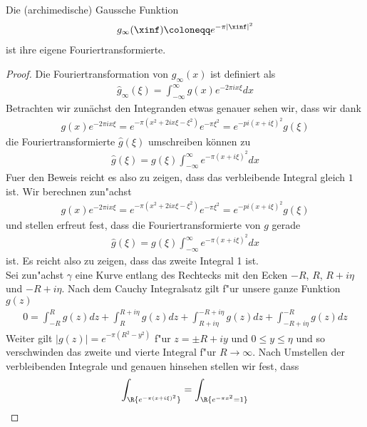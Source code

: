 %
	\begin{satz}
		Die (archimedische) Gaussche Funktion
		\begin{align}
			g_\infty(\xinf) \coloneqq  e^{-\pi |\xinf|^2}
		\end{align}
		ist ihre eigene Fouriertransformierte.
	\end{satz}

	\begin{proof}
		Die Fouriertransformation von $g_\infty(x)$ ist definiert als
		\begin{align*}
			\hat{g}_\infty (\xi) = \int_{-\infty}^{\infty}{g(x)e^{-2\pi i x \xi}dx}
		\end{align*}
		Betrachten wir zunächst den Integranden etwas genauer sehen wir, dass wir dank
		\begin{align*}
			g(x)e^{-2\pi i x \xi} = e^{-\pi(x^2 +2 i x \xi - \xi ^2)}e^{-\pi \xi^2} = e^{-pi (x + i \xi)^2} g(\xi)
		\end{align*}
		die Fouriertransformierte $\hat{g} (\xi)$ umschreiben können zu
		\begin{align*}
			\hat{g}(\xi) = g(\xi) \int_{-\infty}^{\infty} {e^{-\pi(x+i\xi)^2}dx}
		\end{align*}
		Fuer den Beweis reicht es also zu zeigen, dass das verbleibende Integral gleich $1$ ist.
		Wir berechnen zun"achst
		\begin{align*}
			g(x)e^{-2\pi i x \xi} = e^{-\pi(x^2 +2 i x \xi - \xi ^2)}e^{-\pi \xi^2} = e^{-pi (x + i \xi)^2} g(\xi)
		\end{align*}
		und stellen erfreut fest, dass die Fouriertransformierte von $g$ gerade
		\begin{align*}
			\hat{g}(\xi) = g(\xi) \int_{-\infty}^{\infty} e^{-\pi(x+i\xi)^2}dx
		\end{align*}
		ist. Es reicht also zu zeigen, dass das zweite Integral 1 ist.\\
		Sei zun"achst $\gamma$ eine Kurve entlang des Rechtecks mit den Ecken $-R$, $R$, $R+i\eta$ und $-R+i\eta$. 
		Nach dem Cauchy Integralsatz gilt f"ur unsere ganze Funktion $g(z)$
		\begin{align*}
			0 = \int_{-R}^{R} {g(z)dz} + \int_{R}^{R+i\eta} {g(z)dz}  + \int_{R+i\eta}^{-R+i\eta} {g(z)dz}  + \int_{-R+i\eta}^{-R} {g(z)dz} 
		\end{align*}
		Weiter gilt $|g(z)|=e^{-\pi (R^2 - y^2)}$ f"ur $z=\pm R + i y$ und $0\leq y \leq \eta$ und so verschwinden das zweite und vierte Integral f"ur $R\rightarrow \infty$. 
		Nach Umstellen der verbleibenden Integrale und genauen hinsehen stellen wir fest, dass
		\begin{align*}
			\int_\R{e^{-\pi (x + i\xi)^2}} = \int_\R {e^{-\pi x^2} = 1}
		\end{align*}
	\end{proof}